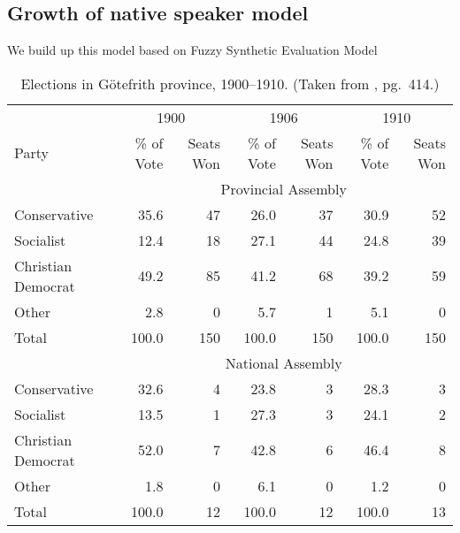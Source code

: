 \documentclass{mcmthesis}
\begin{document}
\subsection{Growth of native speaker model}
\qquad We build up this model based on Fuzzy Synthetic Evaluation Model
\begin{table}
\begin{center}
{\hspace{-1in}
\begin{minipage}{\textwidth}
\fontsize{10}{12}\selectfont
\begin{tabular}[c]{lrrrrrr}
\toprule
              & \multicolumn{2}{c}{1900} & \multicolumn{2}{c}{1906} & \multicolumn{2}{c}{1910}\\
\cmidrule(r){2-3}\cmidrule(lr){4-5}\cmidrule(l){6-7}
Party         & \% of Vote  & Seats Won  & \% of Vote  & Seats Won  & \% of Vote  & Seats Won \\
\midrule
\addlinespace
              & \multicolumn{6}{c}{Provincial Assembly}\\
\cmidrule{2-7}
Conservative  & 35.6        &  47        & 26.0        & 37         & 30.9        & 52\\
Socialist     & 12.4        &  18        & 27.1        & 44         & 24.8        & 39\\
Christian Democrat & 49.2   &  85        & 41.2        & 68         & 39.2        & 59\\
Other         & 2.8         &  0         & 5.7         & 1          & 5.1         & 0\\
\addlinespace
Total& 100.0       &  150       & 100.0       & 150        & 100.0       & 150\\
\addlinespace
              & \multicolumn{6}{c}{National Assembly}\\
\cmidrule{1-7}
Conservative  & 32.6        &   4        & 23.8        &  3         & 28.3        & 3\\
Socialist     & 13.5        &   1        & 27.3        &  3         & 24.1        & 2\\
Christian Democrat & 52.0   &   7        & 42.8        &  6         & 46.4        & 8\\
Other         & 1.8         &   0        & 6.1         &  0         & 1.2         & 0\\
\addlinespace
Total& 100.0       &  12        & 100.0       & 12         & 100.0       & 13\\
\bottomrule
\end{tabular}
\end{minipage}
}
\caption[Elections in G\"{o}tefrith province, 1900--1910]{Elections in
  G\"{o}tefrith province, 1900--1910.  (Taken from \cite{chicago},
  pg.~414.)}%
\label{tab:chicago-table}
\end{center}
\end{table}
\end{document}
